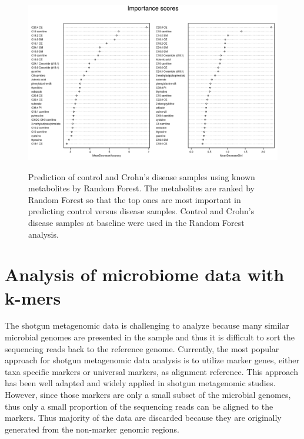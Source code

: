 \begin{figure}[hp]
\centering
{\includegraphics[scale=1.2,trim=0 0 290 30,clip]{Figure/F53_Metabolites_RF.png}
}
\caption[Prediction of control and Crohn's disease samples using known metabolites by Random Forest]{Prediction of control and Crohn's disease samples using known metabolites by Random Forest. The metabolites are ranked by Random Forest so that the top ones are most important in predicting control versus disease samples. Control and Crohn's disease samples at baseline were used in the Random Forest analysis. 
}
\label{F53_Metabolites_RF}
\end{figure}


\section{Analysis of microbiome data with k-mers} 
The shotgun metagenomic data is challenging to analyze because many similar microbial genomes are presented in the sample and thus it is difficult to sort the sequencing reads back to the reference genome. Currently, the most popular approach for shotgun metagenomic data analysis is to utilize marker genes, either taxa specific markers or universal markers, as alignment reference. This approach has been well adapted and widely applied in shotgun metagenomic studies. However, since those markers are only a small subset of the microbial genomes, thus only a small proportion of the sequencing reads can be aligned to the markers. Thus majority of the data are discarded because they are originally generated from the non-marker genomic regions. 

